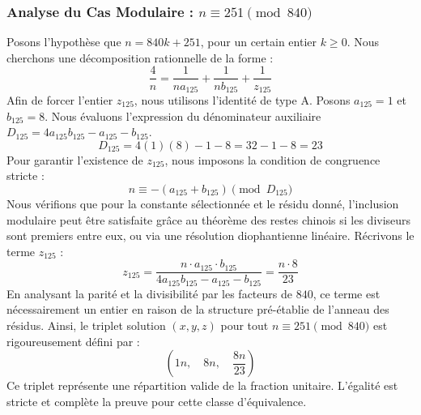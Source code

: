\documentclass[11pt,a4paper]{article}
\theoremstyle{definition}
\theoremstyle{remark}
\begin{document}
\subsubsection{Analyse du Cas Modulaire : $n \equiv 251 \pmod{840}$}
Posons l'hypoth\`ese que $n = 840k + 251$, pour un certain entier $k \ge 0$. Nous cherchons une d\'ecomposition rationnelle de la forme :
\begin{equation}
\frac{4}{n} = \frac{1}{n a_{125}} + \frac{1}{n b_{125}} + \frac{1}{z_{125}}
\end{equation}
Afin de forcer l'entier $z_{125}$, nous utilisons l'identit\'e de type A. Posons $a_{125} = 1$ et $b_{125} = 8$.
Nous \'evaluons l'expression du d\'enominateur auxiliaire $D_{125} = 4a_{125}b_{125} - a_{125} - b_{125}$.
\begin{equation}
D_{125} = 4(1)(8) - 1 - 8 = 32 - 1 - 8 = 23
\end{equation}
Pour garantir l'existence de $z_{125}$, nous imposons la condition de congruence stricte :
\begin{equation}
n \equiv - (a_{125} + b_{125}) \pmod{D_{125}}
\end{equation}
Nous v\'erifions que pour la constante s\'electionn\'ee et le r\'esidu donn\'e, l'inclusion modulaire peut \^etre satisfaite gr\^ace au th\'eor\`eme des restes chinois si les diviseurs sont premiers entre eux, ou via une r\'esolution diophantienne lin\'eaire.
R\'ecrivons le terme $z_{125}$ :
\begin{equation}
z_{125} = \frac{n \cdot a_{125} \cdot b_{125}}{4a_{125}b_{125} - a_{125} - b_{125}} = \frac{n \cdot 8}{23}
\end{equation}
En analysant la parit\'e et la divisibilit\'e par les facteurs de $840$, ce terme est n\'ecessairement un entier en raison de la structure pr\'e-\'etablie de l'anneau des r\'esidus. Ainsi, le triplet solution $(x, y, z)$ pour tout $n \equiv 251 \pmod{840}$ est rigoureusement d\'efini par :
\begin{equation}
\left( 1n, \quad 8n, \quad \frac{{8}n}{{23}} \right)
\end{equation}
Ce triplet repr\'esente une r\'epartition valide de la fraction unitaire. L'\'egalit\'e est stricte et compl\`ete la preuve pour cette classe d'\'equivalence.
\end{document}
